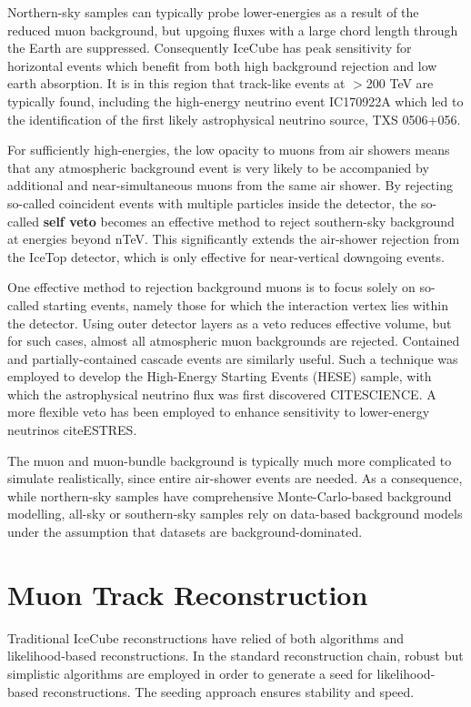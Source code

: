 Northern-sky samples can typically probe lower-energies as a result of the reduced muon background, but  upgoing fluxes with a large chord length through the Earth are suppressed. Consequently IceCube has peak sensitivity for horizontal events which benefit from both high background rejection and low earth absorption. It is in this region that track-like events at $>$200 TeV are typically found, including the high-energy neutrino event IC170922A which led to the identification of the first likely astrophysical neutrino source, TXS 0506+056.

For sufficiently high-energies, the low opacity to muons from air showers means that any atmospheric background event is very likely to be accompanied by additional and near-simultaneous muons from the same air shower. By rejecting so-called coincident events with multiple particles inside the detector, the so-called \textbf{self veto} becomes an effective method to reject southern-sky background at energies beyond nTeV. This significantly extends the air-shower rejection from the IceTop detector, which is only effective for near-vertical downgoing events.

One effective method to rejection background muons is to focus solely on so-called starting events, namely those for which the interaction vertex lies within the detector. Using outer detector layers as a veto reduces effective volume, but for such cases, almost all atmospheric muon backgrounds are rejected. Contained and partially-contained cascade events are similarly useful. Such a technique was employed to develop the High-Energy Starting Events (HESE) sample, with which the astrophysical neutrino flux was first discovered CITESCIENCE. A more flexible veto has been employed to enhance sensitivity to lower-energy neutrinos citeESTRES.

The muon and muon-bundle background is typically much more complicated to simulate realistically, since entire air-shower events are needed. As a consequence, while northern-sky samples have comprehensive Monte-Carlo-based background modelling, all-sky or southern-sky samples rely on data-based background models under the assumption that datasets are background-dominated.
\section{Muon Track Reconstruction}
Traditional IceCube reconstructions have relied of both algorithms and likelihood-based reconstructions. In the standard reconstruction chain, robust but simplistic algorithms are employed in order to generate a seed for likelihood-based reconstructions. The seeding approach ensures stability and speed. 


